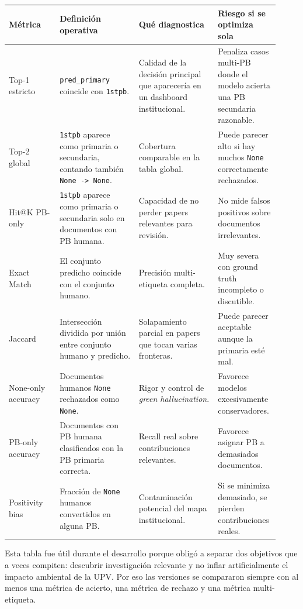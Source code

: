 \begin{center}
\scriptsize
\setlength{\tabcolsep}{4pt}
\renewcommand{\arraystretch}{1.18}
\begin{tabular}{p{0.18\linewidth}p{0.28\linewidth}p{0.28\linewidth}p{0.18\linewidth}}
\toprule
Métrica & Definición operativa & Qué diagnostica & Riesgo si se optimiza sola \\
\midrule
Top-1 estricto & \texttt{pred\_primary} coincide con \texttt{1stpb}. & Calidad de la decisión principal que aparecería en un dashboard institucional. & Penaliza casos multi-PB donde el modelo acierta una PB secundaria razonable. \\
Top-2 global & \texttt{1stpb} aparece como primaria o secundaria, contando también \texttt{None -> None}. & Cobertura comparable en la tabla global. & Puede parecer alto si hay muchos \texttt{None} correctamente rechazados. \\
Hit@K PB-only & \texttt{1stpb} aparece como primaria o secundaria solo en documentos con PB humana. & Capacidad de no perder papers relevantes para revisión. & No mide falsos positivos sobre documentos irrelevantes. \\
Exact Match & El conjunto predicho coincide con el conjunto humano. & Precisión multi-etiqueta completa. & Muy severa con ground truth incompleto o discutible. \\
Jaccard & Intersección dividida por unión entre conjunto humano y predicho. & Solapamiento parcial en papers que tocan varias fronteras. & Puede parecer aceptable aunque la primaria esté mal. \\
None-only accuracy & Documentos humanos \texttt{None} rechazados como \texttt{None}. & Rigor y control de \emph{green hallucination}. & Favorece modelos excesivamente conservadores. \\
PB-only accuracy & Documentos con PB humana clasificados con la PB primaria correcta. & Recall real sobre contribuciones relevantes. & Favorece asignar PB a demasiados documentos. \\
Positivity bias & Fracción de \texttt{None} humanos convertidos en alguna PB. & Contaminación potencial del mapa institucional. & Si se minimiza demasiado, se pierden contribuciones reales. \\
\bottomrule
\end{tabular}
\end{center}

Esta tabla fue útil durante el desarrollo porque obligó a separar dos objetivos que a veces compiten: descubrir investigación relevante y no inflar artificialmente el impacto ambiental de la UPV. Por eso las versiones se compararon siempre con al menos una métrica de acierto, una métrica de rechazo y una métrica multi-etiqueta.

